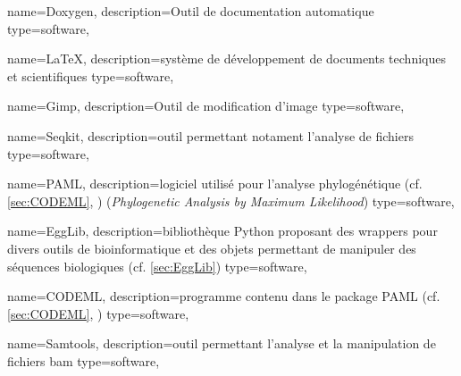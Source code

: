  {
    name=Doxygen,
    description={Outil de documentation automatique \cite{doxygen}}
     type=software,
}
\newcommand{\Doxygen}{\gls{Doxygen}}

 {
    name=\LaTeX,
    description={système de développement de documents techniques et scientifiques \cite{latex}}
     type=software,
}
\newcommand{\Latex}{\gls{Latex}}

 {
    name=Gimp,
    description={Outil de modification d'image \cite{gimp}}
     type=software,
}
\newcommand{\gimp}{\gls{gimp}}

 {
    name=Seqkit,
    description={outil permettant notament l'analyse de fichiers \fastq\s \cite{seqkit1} \cite{seqkit2}}
     type=software,
}

 {
    name=PAML,
    description={logiciel utilisé pour l'analyse phylogénétique (cf. \cref{sec:CODEML}, \cite{yang_paml_2020}) (\textit{Phylogenetic Analysis by Maximum Likelihood})}
     type=software,
}

 {
    name=EggLib,
    description={bibliothèque \gls{Python} proposant des \glspl{wrapper} pour divers outils de bioinformatique et des objets permettant de manipuler des séquences biologiques (cf. \cref{sec:EggLib}) \cite{siol_egglib_2022}}
     type=software,
}

 {
    name=CODEML,
    description={programme  contenu dans le package \gls{PAML} (cf. \cref{sec:CODEML}, \cite{noauthor_paml-tutorialpositive-selection_nodate})}
     type=software,
}

 {
    name=Samtools,
    description={outil permettant l'analyse et la manipulation de fichiers \gls{bam}}
     type=software,
}



\newcommand{\SNP}{\acrshort{snp}}
\newcommand{\SNPFULL}{\acrfull{snp}}


\newcommand{\TrEx}{\acrshort{TrEx}}

\newcommand{\GeMo}{\acrshort{GeMo}}

